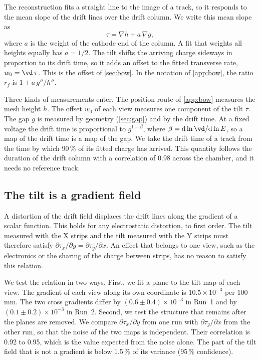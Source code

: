 The reconstruction fits a straight line to the image of a track, so it responds to the mean slope of the drift lines
over the drift column. We write this mean slope as
\begin{equation}
  \tau=\nabla h+a\,\nabla g,
  \label{eq:tilt}
\end{equation}
where $a$ is the weight of the cathode end of the column. A fit that weights all heights equally has $a=1/2$. The tilt
shifts the arriving charge sideways in proportion to its drift time, so it adds an offset to the fitted transverse
rate, $w_0=\vd\,\tau$. This is the offset of \cref{sec:bow}. In the notation of \cref{app:bow}, the ratio $r_f$ is
$1+a\,g''/h''$.

Three kinds of measurements enter. The position route of \cref{app:bow} measures the mesh height $h$. The offset $w_0$
of each view measures one component of the tilt $\tau$. The gap $g$ is measured by geometry (\cref{sec:gap}) and by the
drift time. At a fixed voltage the drift time is proportional to $g^{1+\beta}$, where
$\beta=\mathrm{d}\ln\vd/\mathrm{d}\ln E$, so a map of the drift time is a map of the gap. We take the drift time of a
track from the time by which 90\,\% of its fitted charge has arrived. This quantity follows the duration of the drift
column with a correlation of 0.98 across the chamber, and it needs no reference track.

\subsection{The tilt is a gradient field}
A distortion of the drift field displaces the drift lines along the gradient of a scalar function. This holds for any
electrostatic distortion, to first order. The tilt measured with the X strips and the tilt measured with the Y strips
must therefore satisfy $\partial\tau_x/\partial y=\partial\tau_y/\partial x$. An effect that belongs to one view, such as
the electronics or the sharing of the charge between strips, has no reason to satisfy this relation.

We test the relation in two ways. First, we fit a plane to the tilt map of each view. The gradient of each view along
its own coordinate is $10.5\times10^{-3}$ per 100\,mm. The two cross gradients differ by $(0.6\pm0.4)\times10^{-3}$ in
Run~1 and by $(0.1\pm0.2)\times10^{-3}$ in Run~2. Second, we test the structure that remains after the planes are
removed. We compare $\partial\tau_x/\partial y$ from one run with $\partial\tau_y/\partial x$ from the other run, so
that the noise of the two maps is independent. Their correlation is 0.92 to 0.95, which is the value expected from the
noise alone. The part of the tilt field that is not a gradient is below 1.5\,\% of its variance (95\,\% confidence).

